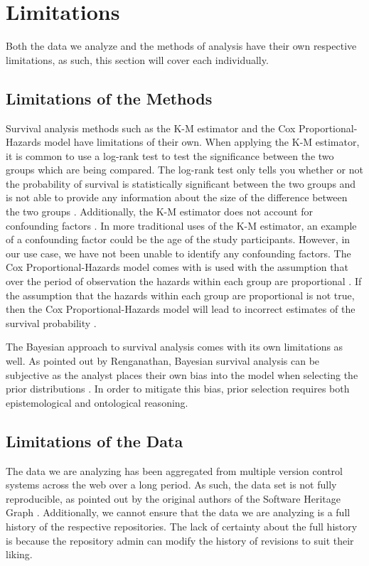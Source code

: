 \documentclass[conference]{IEEEtran}
\begin{document}
\section{Limitations}

Both the data we analyze and the methods of analysis have their own respective limitations, as such, this section will cover each individually.

\subsection{Limitations of the Methods}

Survival analysis methods such as the K-M estimator and the Cox Proportional-Hazards model have limitations of their own. When applying the K-M estimator, it is common to use a log-rank test to test the significance between the two groups which are being compared. The log-rank test only tells you whether or not the probability of survival is statistically significant between the two groups and is not able to provide any information about the size of the difference between the two groups \cite{stel2011kaplan}. Additionally, the K-M estimator does not account for confounding factors \cite{stel2011kaplan}. In more traditional uses of the K-M estimator, an example of a confounding factor could be the age of the study participants. However, in our use case, we have not been unable to identify any confounding factors. The Cox Proportional-Hazards model comes with is used with the assumption that over the period of observation the hazards within each group are proportional \cite{stel2011cox}. If the assumption that the hazards within each group are proportional is not true, then the Cox Proportional-Hazards model will lead to incorrect estimates of the survival probability \cite{stel2011cox}.

The Bayesian approach to survival analysis comes with its own limitations as well. As pointed out by Renganathan, Bayesian survival analysis can be subjective as the analyst places their own bias into the model when selecting the prior distributions \cite{renganathan2016overview}. In order to mitigate this bias, prior selection requires both epistemological and ontological reasoning.

\subsection{Limitations of the Data}

The data we are analyzing has been aggregated from multiple version control systems across the web over a long period. As such, the data set is not fully reproducible, as pointed out by the original authors of the Software Heritage Graph \cite{pietri2019software}. Additionally, we cannot ensure that the data we are analyzing is a full history of the respective repositories. The lack of certainty about the full history is because the repository admin can modify the history of revisions to suit their liking.



\end{document}
